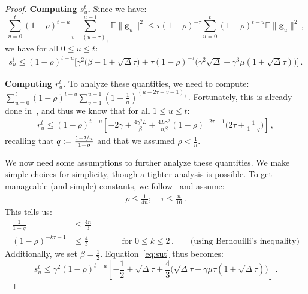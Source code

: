 \documentclass{article}
\def\EE{{\mathbb E}}
\begin{document}
\begin{proof}
  \textbf{Computing $s_u^t$.}
  Since we have:
  \begin{equation}
    \sum_{u=0}^t (1 - \rho)^{t-u} \sum_{v = (u - \tau)_+}^{u-1}\EE \|\boldsymbol g_u\|^2
    \leq \tau (1 - \rho)^{-\tau} \sum_{u=0}^t (1 - \rho)^{t - u}  \EE\|\boldsymbol g_u\|^2 \,,
  \end{equation}
  we have for all $0 \leq u \leq t$:
  \begin{equation} \label{eq:sut}
  \begin{aligned}
  s_u^t \leq (1 - \rho)^{t - u} \Big[\gamma^2 \big(\beta -1 + \sqrt{\Delta} \tau) + \tau (1 - \rho)^{-\tau} \big(\gamma^2 \sqrt{\Delta} + \gamma^3 \mu (1 + \sqrt{\Delta}\tau) \big)\Big] \, .
  \end{aligned}
  \end{equation}

  \textbf{Computing $r_u^t$.}
  To analyze these quantities, we need to compute: $\sum_{u = 0}^t(1 - \rho)^{t-u} \sum_{v = 1}^{u-1} (1 - \frac{1}{n})^{(u - 2 \tau - v  - 1)_+}$.
  Fortunately, this is already done in~\citet[Eq (66)]{leblond2016Asaga}, and thus we know that for all $1\leq u \leq t$:
  \begin{equation} \label{eq:rut}
  \begin{aligned}
  r_u^t \leq (1 - \rho)^{t - u} \left[-2 \gamma + \frac{4\gamma^2 L}{\beta} + \frac{4L \gamma^2}{n \beta} (1 - \rho)^{-2 \tau -1} \Big( 2\tau+  \frac{1}{1 - q}\Big)\right]\,,
  \end{aligned}
  \end{equation}
  recalling that $q := \frac{1 - \nicefrac{1}{n}}{1 - \rho}$ and that we assumed $\rho < \frac{1}{n}$.

  We now need some assumptions to further analyze these quantities.
  We make simple choices for simplicity, though a tighter analysis is possible.
  To get manageable (and simple) constants, we follow~\citet[Eq.~(82) and (83)]{leblond2016Asaga} and assume:
  \begin{equation} \label{eq:initialRhoTauConditions}
  \begin{aligned}
  \rho \leq \frac{1}{4 n}  ;\quad \tau \leq \frac{n}{10} \,.
  \end{aligned}
  \end{equation}
  This tells us:
  \begin{equation*}
  \begin{aligned}
  \frac{1}{1 - q} &\leq \frac{4 n}{3}
  \\
  (1 - \rho)^{- k \tau - 1} &\leq \frac{4}{3} \qquad \qquad \text{for} \, \, 0 \leq k \leq 2 \,.
  \qquad \text{(using Bernouilli's inequality)}
  \end{aligned}
  \end{equation*}
  Additionally, we set $\beta = \frac{1}{2}$.
  Equation~\eqref{eq:sut} thus becomes:
  \begin{equation}
  s_u^t \leq \gamma^2 (1 - \rho)^{t - u} \left[-\frac{1}{2} + \sqrt{\Delta} \tau + \frac{4}{3} \big( \sqrt{\Delta} \tau + \gamma \mu \tau (1 + \sqrt{\Delta} \tau) \big)\right] \,.
  \end{equation}


\end{proof}
\end{document}

